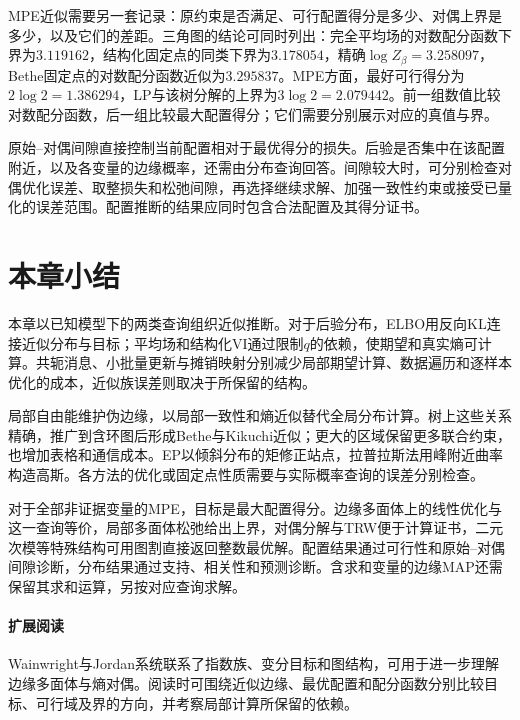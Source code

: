 MPE近似需要另一套记录：原约束是否满足、可行配置得分是多少、对偶上界是多少，以及它们的差距。三角图的结论可同时列出：完全平均场的对数配分函数下界为$3.119162$，结构化固定点的同类下界为$3.178054$，精确$\log Z_\beta=3.258097$，Bethe固定点的对数配分函数近似为$3.295837$。MPE方面，最好可行得分为$2\log2=1.386294$，LP与该树分解的上界为$3\log2=2.079442$。前一组数值比较对数配分函数，后一组比较最大配置得分；它们需要分别展示对应的真值与界。

原始--对偶间隙直接控制当前配置相对于最优得分的损失。后验是否集中在该配置附近，以及各变量的边缘概率，还需由分布查询回答。间隙较大时，可分别检查对偶优化误差、取整损失和松弛间隙，再选择继续求解、加强一致性约束或接受已量化的误差范围。配置推断的结果应同时包含合法配置及其得分证书。

\section{本章小结}
\label{sec:pgm-variational-summary}

本章以已知模型下的两类查询组织近似推断。对于后验分布，ELBO用反向KL连接近似分布与目标；平均场和结构化VI通过限制$q$的依赖，使期望和真实熵可计算。共轭消息、小批量更新与摊销映射分别减少局部期望计算、数据遍历和逐样本优化的成本，近似族误差则取决于所保留的结构。

局部自由能维护伪边缘，以局部一致性和熵近似替代全局分布计算。树上这些关系精确，推广到含环图后形成Bethe与Kikuchi近似；更大的区域保留更多联合约束，也增加表格和通信成本。EP以倾斜分布的矩修正站点，拉普拉斯法用峰附近曲率构造高斯。各方法的优化或固定点性质需要与实际概率查询的误差分别检查。

对于全部非证据变量的MPE，目标是最大配置得分。边缘多面体上的线性优化与这一查询等价，局部多面体松弛给出上界，对偶分解与TRW便于计算证书，二元次模等特殊结构可用图割直接返回整数最优解。配置结果通过可行性和原始--对偶间隙诊断，分布结果通过支持、相关性和预测诊断。含求和变量的边缘MAP还需保留其求和运算，另按对应查询求解。

\paragraph{扩展阅读}
Wainwright与Jordan系统联系了指数族、变分目标和图结构，可用于进一步理解边缘多面体与熵对偶。阅读时可围绕近似边缘、最优配置和配分函数分别比较目标、可行域及界的方向，并考察局部计算所保留的依赖。